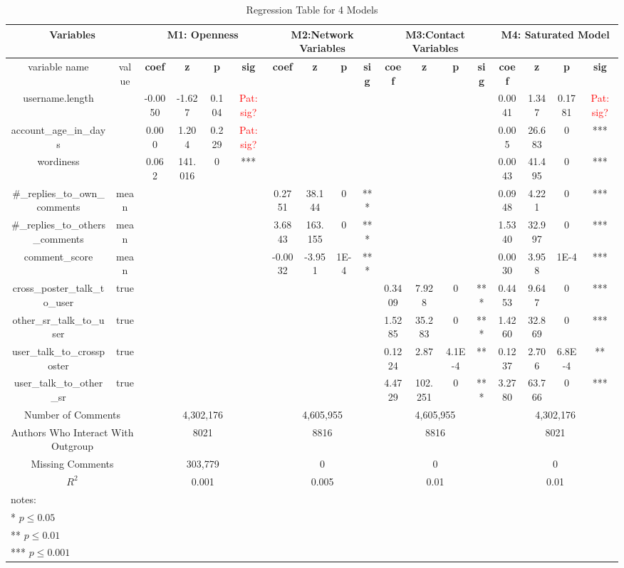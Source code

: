 \documentclass[letterpaper]{article}
\newcommand{\pat}[1]{{\textcolor{red}{Pat: #1}}}
\begin{document}
\begin{table*}
\caption{Regression Table for 4 Models}
\centering
\begin{threeparttable}
 \begin{adjustbox}{max width=\textwidth}
\begin{tabular}{|*{18}{c|}}
\hline
\multicolumn{2}{|c|}{ Variables}& \multicolumn{4}{|c|}{M1: Openness}&\multicolumn{4}{|c|}{M2:Network Variables}&\multicolumn{4}{|c|}{M3:Contact Variables}&\multicolumn{4}{c|}{M4: Saturated Model} \\ \hline


variable name&value&\textbf{coef}&\textbf{z}&\textbf{p}&\textbf{sig}&\textbf{coef}&\textbf{z}&\textbf{p}&\textbf{sig}&\textbf{coef}&\textbf{z}&\textbf{p}&\textbf{sig}&\textbf{coef}&\textbf{z}&\textbf{p}&\textbf{sig} \\ \hline \hline
username.length&&-0.0050&-1.627&0.104&\pat{sig?}&&&&&&&&&0.0041&1.347&0.1781&\pat{sig?}\\
account\_age\_in\_days&&0.000&1.204&0.229&\pat{sig?}&&&&&&&&&0.005&26.683&0&***\\
wordiness&&0.062&141.016&0&***&&&&&&&&&0.0043&41.495&0&***\\
\#\_replies\_to\_own\_comments&mean&&&&&0.2751&38.144&0&***&&&&&0.0948&4.221&0&***\\
\#\_replies\_to\_others\_comments&mean&&&&&3.6843&163.155&0&***&&&&&1.5340&32.997&0&***\\
comment\_score&mean&&&&&-0.0032&-3.951&1E-4&***&&&&&0.0030&3.958&1E-4&***\\
cross\_poster\_talk\_to\_user&true&&&&&&&&&0.3409&7.928&0&***&0.4453&9.647&0&***\\
other\_sr\_talk\_to\_user&true&&&&&&&&&1.5285&35.283&0&***&1.4260&32.869&0&***\\
user\_talk\_to\_crossposter&true&&&&&&&&&0.1224&2.87&4.1E-4&**&0.1237&2.706&6.8E-4&**\\
user\_talk\_to\_other\_sr&true&&&&&&&&&4.4729&102.251&0&***&3.2780&63.766&0&***\\
\hline
\hline

\multicolumn{2}{|c}{Number of Comments}&\multicolumn{4}{|c|}{4,302,176}&\multicolumn{4}{|c|}{4,605,955}&\multicolumn{4}{|c|}{4,605,955}&\multicolumn{4}{|c|}{4,302,176}\\
\hline
\multicolumn{2}{|c|}{Authors Who Interact With Outgroup}&\multicolumn{4}{|c|}{8021}&\multicolumn{4}{|c|}{8816}&\multicolumn{4}{|c|}{8816}&\multicolumn{4}{|c|}{8021}\\
\hline
\multicolumn{2}{|c|}{Missing Comments}&\multicolumn{4}{|c|}{303,779}&\multicolumn{4}{|c|}{0}&\multicolumn{4}{|c|}{0}&\multicolumn{4}{|c|}{0}\\
\hline
\multicolumn{2}{|c|}{$R^2$}&\multicolumn{4}{|c|}{0.001}&\multicolumn{4}{|c|}{0.005}&\multicolumn{4}{|c|}{0.01}&\multicolumn{4}{|c|}{0.01}\\
\hline
\multicolumn{18}{l}{notes:}{}\\
\multicolumn{18}{l}{* $p \leq 0.05$}\\
\multicolumn{18}{l}{** $p \leq 0.01$}\\
\multicolumn{18}{l}{*** $p \leq 0.001$}\\


\end{tabular}
\end{adjustbox}
\end{threeparttable}
\end{table*}
\end{document}
